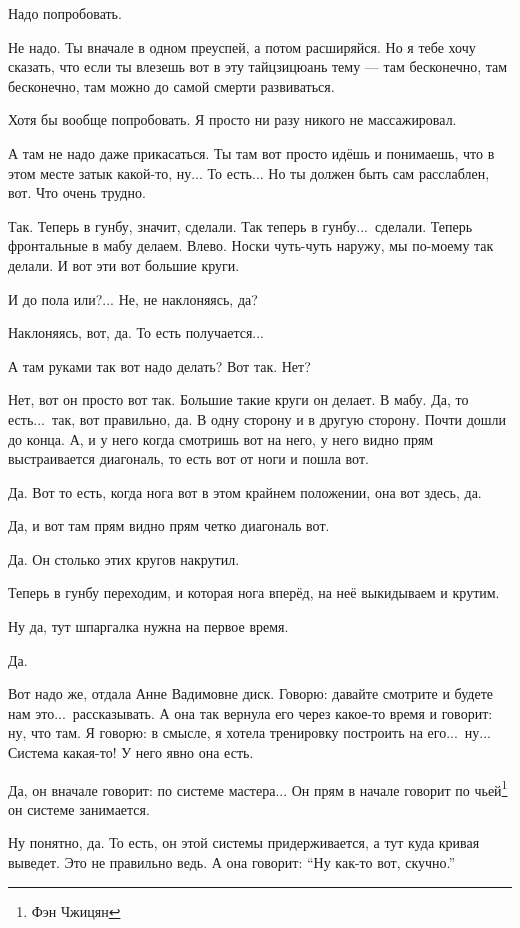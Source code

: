 \I
Надо попробовать.

\M
Не надо. Ты вначале в одном преуспей, а потом расширяйся. Но я тебе хочу сказать,
что если ты влезешь вот в эту тайцзицюань тему --- там
бесконечно, там бесконечно, там можно до самой смерти развиваться.

\I
Хотя бы вообще попробовать. Я просто ни разу никого не массажировал.

\M
А там не надо даже прикасаться. Ты
там вот просто идёшь и понимаешь, что в
этом месте затык какой-то, ну... То есть... Но ты должен быть сам расслаблен, вот.
Что очень трудно.

\I
Так. Теперь в гунбу, значит, сделали. Так теперь в гунбу...\ сделали. Теперь фронтальные в мабу
делаем. Влево.
Носки чуть-чуть наружу, мы по-моему так делали.
И вот эти вот большие круги.

\M
И до пола или?... Не, не наклоняясь, да?

\I
Наклоняясь, вот, да. То есть получается...

\M
А там руками так вот надо делать? Вот так. Нет?

\I
Нет, вот он просто вот так. Большие такие
круги он делает. В мабу.
Да, то есть...\ так, вот правильно, да.
В одну сторону и в другую сторону.
Почти дошли до конца.
А, и у него когда смотришь вот на него, у него видно прям выстраивается диагональ, то
есть вот от ноги и пошла вот.

\M
Да. Вот то
есть, когда нога вот в этом крайнем положении, она вот здесь, да.

\I
Да, и вот там прям видно прям четко диагональ вот.

\M
Да. Он столько этих кругов накрутил.

\I
Теперь в гунбу переходим, и которая нога вперёд, на неё выкидываем и крутим.

\M
Ну да, тут шпаргалка нужна на первое время.

\I
Да.

\M
Вот надо же, отдала Анне Вадимовне диск. Говорю: давайте смотрите и будете нам это...\
рассказывать.
А она так вернула его через какое-то время
и говорит: ну, что там.
Я говорю: в смысле, я хотела тренировку построить на его...\ ну...
Система какая-то! У него явно она есть.

\I
Да, он вначале говорит: по системе мастера...
Он прям в начале говорит по чьей\footnote*{Фэн Чжицян} он системе
занимается.

\M
Ну понятно, да. То есть, он этой системы придерживается, а тут куда кривая выведет.
Это не правильно ведь.
А она говорит: ``Ну как-то вот, скучно.''

